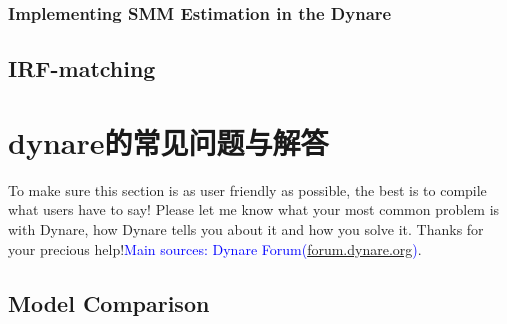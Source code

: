 \documentclass[10pt,math=newtx,citestyle=gb7714-2015,bibstyle=gb7714-2015]{elegantbook}
\begin{document}
{{{	\subsection{Implementing SMM Estimation in the Dynare}
	
	
	
	
	\section{IRF-matching}
	
	
	
	\nocite{*} 
	\printbibliography
	\appendix
	
	\chapter{dynare的常见问题与解答}
	
	To make sure this section is as user friendly as possible, the best is to compile what users have to say! Please let me know what your most common problem is with Dynare, how Dynare tells you about it and how you solve it. Thanks for your precious help!\textcolor{blue}{Main sources: Dynare Forum(\url{forum.dynare.org})}.
	
	\section{Model Comparison}
	
}}}
\end{document}
